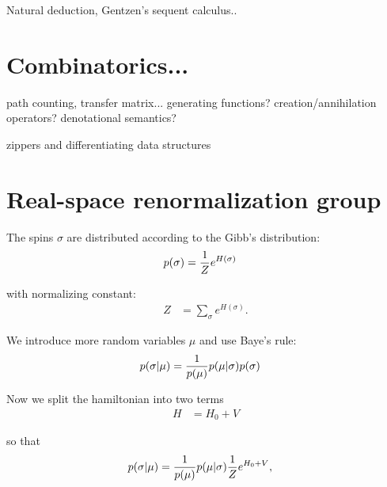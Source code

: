 \documentclass[11pt]{article}
\begin{document}
Natural deduction, Gentzen's sequent calculus..

%
%

\section{Combinatorics...}

path counting, transfer matrix...
generating functions? 
creation/annihilation operators?
denotational semantics?

zippers and differentiating data structures



%
%

\section{Real-space renormalization group}


The spins $\sigma$ are distributed according
to the Gibb's distribution:
\begin{align*}
p(\sigma) &= {{1} \over {Z}}e^{H(\sigma)}
\end{align*}

with normalizing constant:
\begin{align*}
Z &= \sum_{\sigma} e^{H(\sigma)}.
\end{align*}

We introduce more random variables $\mu$ and
use Baye's rule:
\begin{align*}
p(\sigma | \mu) &= {{1} \over {p(\mu)}}p(\mu | \sigma)p(\sigma)
\end{align*}

Now we split the hamiltonian into two terms
\begin{align*}
H &= H_{0}+V
\end{align*}

so that
\begin{align*}
p(\sigma | \mu) &= {{1} \over {p(\mu)}}p(\mu | \sigma){{1} \over {Z}}e^{H_{0}+V},
\end{align*}
\end{document}
